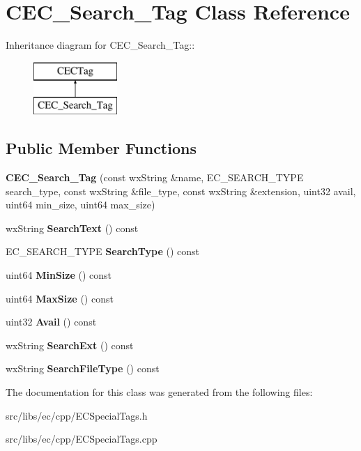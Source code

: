 \section{CEC\_\-Search\_\-Tag Class Reference}
\label{classCEC__Search__Tag}
Inheritance diagram for CEC\_\-Search\_\-Tag::\begin{figure}[H]
\begin{center}
\leavevmode
\includegraphics[height=2cm]{classCEC__Search__Tag}
\end{center}
\end{figure}
\subsection*{Public Member Functions}
\begin{DoxyCompactItemize}
\item 
{\bfseries CEC\_\-Search\_\-Tag} (const wxString \&name, EC\_\-SEARCH\_\-TYPE search\_\-type, const wxString \&file\_\-type, const wxString \&extension, uint32 avail, uint64 min\_\-size, uint64 max\_\-size)\label{classCEC__Search__Tag_a6eff4d75d014f860bff46a368e1ab2a7}

\item 
wxString {\bfseries SearchText} () const \label{classCEC__Search__Tag_afe3b4df09810f54b488413edc80a060b}

\item 
EC\_\-SEARCH\_\-TYPE {\bfseries SearchType} () const \label{classCEC__Search__Tag_a7111d5142bfd0d0ae0e58231a2201d4e}

\item 
uint64 {\bfseries MinSize} () const \label{classCEC__Search__Tag_ac27c54abc918df5d2438daf93a338a84}

\item 
uint64 {\bfseries MaxSize} () const \label{classCEC__Search__Tag_a4d7a4e3a71c2f9c033225dbcfed4e063}

\item 
uint32 {\bfseries Avail} () const \label{classCEC__Search__Tag_a756f03db15bcf657346b4255733f1041}

\item 
wxString {\bfseries SearchExt} () const \label{classCEC__Search__Tag_a633d8724cecc22553e6f725c35782b44}

\item 
wxString {\bfseries SearchFileType} () const \label{classCEC__Search__Tag_ae85add665e4b51a33f7718c99c14c549}

\end{DoxyCompactItemize}


The documentation for this class was generated from the following files:\begin{DoxyCompactItemize}
\item 
src/libs/ec/cpp/ECSpecialTags.h\item 
src/libs/ec/cpp/ECSpecialTags.cpp\end{DoxyCompactItemize}
